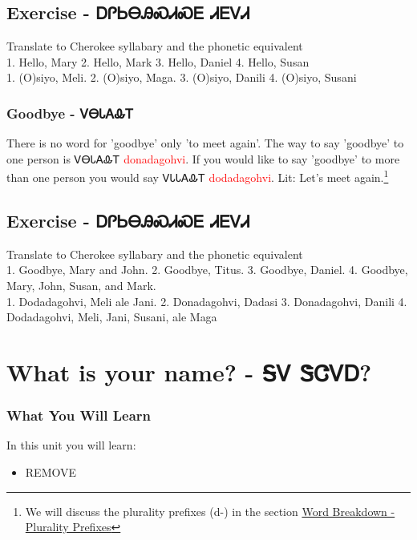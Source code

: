 \section{Exercise - ᎠᎵᏏᎾᎯᏍᏗᏍᎬ ᏗᎬᏙᏗ}
Translate to Cherokee syllabary and the phonetic equivalent\\
1. Hello, Mary 2. Hello, Mark 3. Hello, Daniel 4. Hello, Susan\\
1. (O)siyo, Meli. 2. (O)siyo, Maga. 3. (O)siyo, Danili 4. (O)siyo, Susani\\
\subsection{Goodbye - ᏙᎾᏓᎪᎲᎢ}
There is no word for 'goodbye' only 'to meet again'. The way to say 'goodbye' to one person is ᏙᎾᏓᎪᎲᎢ \textcolor{red}{donadagohvi}. If you would like to say 'goodbye' to more than one person you would say ᏙᏓᏓᎪᎲᎢ \textcolor{red}{dodadagohvi}.  Lit: Let's meet again.\footnote{We will discuss the plurality prefixes (d-) in the section \hyperref[sec:wordBreakdownPluralityPrefixes]{Word Breakdown - Plurality Prefixes}}
\section{Exercise - ᎠᎵᏏᎾᎯᏍᏗᏍᎬ ᏗᎬᏙᏗ}
Translate to Cherokee syllabary and the phonetic equivalent\\
1. Goodbye, Mary and John. 2. Goodbye, Titus. 3. Goodbye, Daniel. 4. Goodbye, Mary, John, Susan, and Mark.\\
1. Dodadagohvi, Meli ale Jani. 2. Donadagohvi, Dadasi 3. Donadagohvi, Danili 4. Dodadagohvi, Meli, Jani, Susani, ale Maga\\
\chapter{What is your name? - ᎦᏙ ᏕᏣᏙᎠ?}
\subsection{What You Will Learn}
In this unit you will learn:
\begin{itemize}
\item REMOVE
\end{itemize}\newpage

